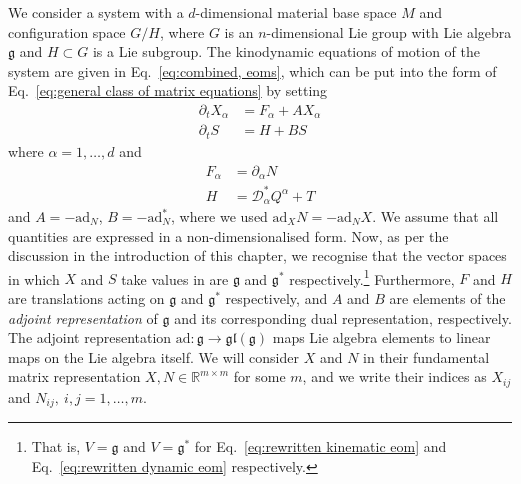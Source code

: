 We consider a system with a $d$-dimensional material base space $M$ and configuration space $G/H$, where $G$ is an $n$-dimensional Lie group with Lie algebra $\mathfrak{g}$ and $H \subset G$ is a Lie subgroup. The kinodynamic equations of motion of the system are given in Eq.~\ref{eq:combined, eoms}, which can be put into the form of Eq.~\ref{eq:general class of matrix equations} by setting
\begin{subequations} \label{eq:rewritten kinodynamic eoms}
	\begin{align}
		\partial_t X_\alpha  & = F_\alpha + A X_\alpha \label{eq:rewritten kinematic eom} \\
		\partial_t S & = H + B S \label{eq:rewritten dynamic eom}
	\end{align}
\end{subequations}
where $\alpha = 1, \dots, d$ and
\begin{subequations} \label{eq:F H defs}
	\begin{align}
		F_\alpha & = \partial_\alpha N \\
		H & = \mathcal{D}^*_\alpha Q^\alpha + T
	\end{align}
\end{subequations}
and $A = - \text{ad}_N$, $B = - \text{ad}^*_N$, where we used $\text{ad}_X N = - \text{ad}_N X$. We assume that all quantities are expressed in a non-dimensionalised form. Now, as per the discussion in the introduction of this chapter, we recognise that the vector spaces in which $X$ and $S$ take values in are $\mathfrak{g}$ and $\mathfrak{g}^*$ respectively.\footnote{That is, $V = \mathfrak{g}$ and $V = \mathfrak{g}^*$ for Eq.~\ref{eq:rewritten kinematic eom} and Eq.~\ref{eq:rewritten dynamic eom} respectively.} Furthermore, $F$ and $H$ are translations acting on  $\mathfrak{g}$ and $\mathfrak{g}^*$ respectively, and $A$ and $B$ are elements of the \textit{adjoint representation} of $\mathfrak{g}$ and its corresponding dual representation, respectively. The adjoint representation $\text{ad} : \mathfrak{g} \to \mathfrak{gl}(\mathfrak{g})$ maps Lie algebra elements to linear maps on the Lie algebra itself. We will consider $X$ and $N$ in their fundamental matrix representation $X,N \in \mathbb{R}^{m \times m}$ for some $m$, and we write their indices as $X_{ij}$ and $N_{ij},\ i,j=1,\dots, m$.

